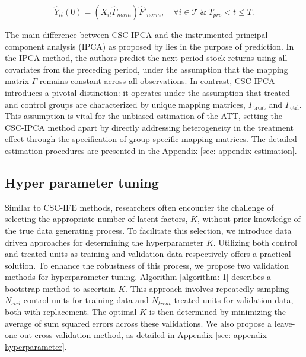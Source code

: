 \documentclass[12pt]{article}
\begin{document}
\begin{equation}
\hat{Y}_{it}(0) = (X_{it} \hat{\Gamma}_{norm}) \hat{F}'_{norm}, \quad \forall i \in \mathcal{T} \ \& \ T_{pre} < t \leq T.
\end{equation}

The main difference between CSC-IPCA and the instrumented principal component analysis (IPCA) as proposed by \cite{kelly2020instrumented} lies in the purpose of prediction. In the IPCA method, the authors predict the next period stock returns using all covariates from the preceding period, under the assumption that the mapping matrix $\Gamma$ remains constant across all observations. In contrast, CSC-IPCA introduces a pivotal distinction: it operates under the assumption that treated and control groups are characterized by unique mapping matrices, $\Gamma_{\text{treat}}$ and $\Gamma_{\text{ctrl}}$. This assumption is vital for the unbiased estimation of the ATT, setting the CSC-IPCA method apart by directly addressing heterogeneity in the treatment effect through the specification of group-specific mapping matrices. The detailed estimation procedures are presented in the Appendix \ref{sec: appendix estimation}.

\subsection{Hyper parameter tuning}
Similar to CSC-IFE methods, researchers often encounter the challenge of selecting the appropriate number of latent factors, $K$, without prior knowledge of the true data generating process. To facilitate this selection, we introduce data driven approaches for determining the hyperparameter $K$. Utilizing both control and treated units as training and validation data respectively offers a practical solution. To enhance the robustness of this process, we propose two validation methods for hyperparameter tuning. Algorithm \ref{algorithm: 1} describes a bootstrap method to ascertain $K$. This approach involves repeatedly sampling $N_{ctrl}$ control units for training data and $N_{treat}$ treated units for validation data, both with replacement. The optimal $K$ is then determined by minimizing the average of sum squared errors across these validations. We also propose a leave-one-out cross validation method, as detailed in Appendix \ref{sec: appendix hyperparameter}.
\end{document}
